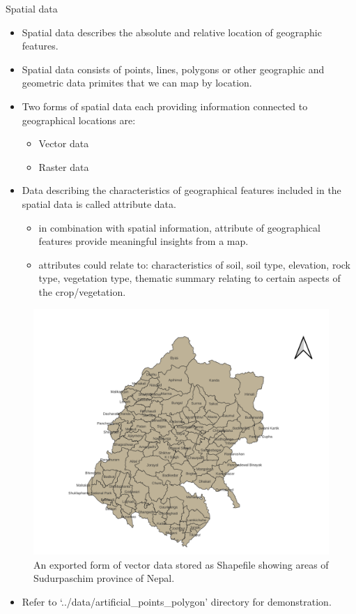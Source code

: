 \documentclass[11pt,dvipsnames,ignorenonframetext,aspectratio=169]{beamer}
\providecommand{\tightlist}{%
  \setlength{\itemsep}{0pt}\setlength{\parskip}{0pt}}
\begin{document}
\begin{frame}{Spatial data}
\protect\hypertarget{spatial-data}{}
\begin{itemize}
\tightlist
\item
  \alert{Spatial data} describes the absolute and relative location of
  geographic features.
\item
  Spatial data consists of points, lines, polygons or other geographic
  and geometric data primites that we can map by location.
\item
  Two forms of spatial data each providing information connected to
  geographical locations are:

  \begin{itemize}
  \tightlist
  \item
    Vector data
  \item
    Raster data
  \end{itemize}
\item
  Data describing the characteristics of geographical features included
  in the spatial data is called \alert{attribute data}.

  \begin{itemize}
  \tightlist
  \item
    in combination with spatial information, attribute of geographical
    features provide meaningful insights from a map.
  \item
    attributes could relate to: characteristics of soil, soil type,
    elevation, rock type, vegetation type, thematic summary relating to
    certain aspects of the crop/vegetation.
  \end{itemize}
\end{itemize}
\end{frame}

\begin{frame}{}
\protect\hypertarget{section-2}{}
\begin{figure}
\includegraphics[width=0.55\linewidth]{../images/sudurpaschim_LU_labelled} \caption{An exported form of vector data stored as Shapefile showing areas of Sudurpaschim province of Nepal.}\label{fig:spatial-raster-data}
\end{figure}

\footnotesize

\begin{itemize}
\tightlist
\item
  Refer to `../data/artificial\_points\_polygon' directory for
  demonstration.
\end{itemize}
\end{frame}
\end{document}
